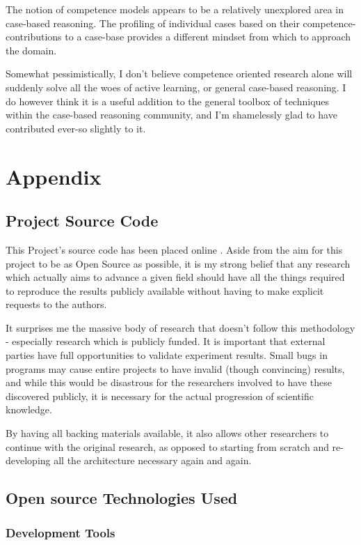 \documentclass[a4paper,11pt]{report}
\begin{document}
The notion of competence models appears to be a relatively unexplored area in case-based reasoning. The profiling of individual cases based on their competence-contributions to a case-base provides a different mindset from which to approach the domain.

Somewhat pessimistically, I don't believe competence oriented research alone will suddenly solve all the woes of active learning, or general case-based reasoning. I do however think it is a useful addition to the general toolbox of techniques within the case-based reasoning community, and I'm shamelessly glad to have contributed ever-so slightly to it.

\chapter{Appendix}
\section{Project Source Code}
This Project's source code has been placed online \citep{web:projectsourcecode}. Aside from the aim for this project to be as Open Source as possible, it is my strong belief that any research which actually aims to advance a given field should have all the things required to reproduce the results publicly available without having to make explicit requests to the authors. 

It surprises me the massive body of research that doesn't follow this methodology - especially research which is publicly funded. It is important that external parties have full opportunities to validate experiment results. Small bugs in programs may cause entire projects to have invalid (though convincing) results, and while this would be disastrous for the researchers involved to have these discovered publicly, it is necessary for the actual progression of scientific knowledge.

By having all backing materials available, it also allows other researchers to continue with the original research, as opposed to starting from scratch and re-developing all the architecture necessary again and again.

\section{Open source Technologies Used}
\subsection{Development Tools}
\end{document}
